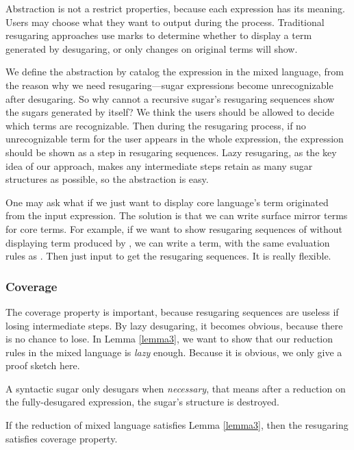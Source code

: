 Abstraction is not a restrict properties, because each expression has its meaning. Users may choose what they want to output during the process. Traditional resugaring approaches use marks to determine whether to display a term generated by desugaring, or only changes on original terms will show.

We define the abstraction by catalog the expression in the mixed language, from the reason why we need resugaring---sugar expressions become unrecognizable after desugaring. So why cannot a recursive sugar's resugaring sequences show the sugars generated by itself? We think the users should be allowed to decide which terms are recognizable. Then during the resugaring process, if no unrecognizable term for the user appears in the whole expression, the expression should be shown as a step in resugaring sequences. Lazy resugaring, as the key idea of our approach, makes any intermediate steps retain as many sugar structures as possible, so the abstraction is easy.

One may ask what if we just want to display core language's term originated from the input expression. The solution is that we can write surface mirror terms for core terms. For example, if we want to show resugaring sequences of  without displaying  term produced by , we can write a  term, with the same evaluation rules as . Then just input  to get the resugaring sequences. It is really flexible.

\subsubsection{Coverage}
The coverage property is important, because resugaring sequences are useless if losing intermediate steps. By lazy desugaring, it becomes obvious, because there is no chance to lose. In Lemma \ref{lemma3}, we want to show that our reduction rules in the mixed language is \emph{lazy} enough. Because it is obvious, we only give a proof sketch here.
\begin{lemma}
\label{lemma3}
A syntactic sugar only desugars when \emph{necessary}, that means after a reduction on the fully-desugared expression, the sugar's structure is destroyed.
\end{lemma}

\begin{Def}[Coverage]
If the reduction of mixed language satisfies Lemma \ref{lemma3}, then the resugaring satisfies coverage property.
\end{Def}



